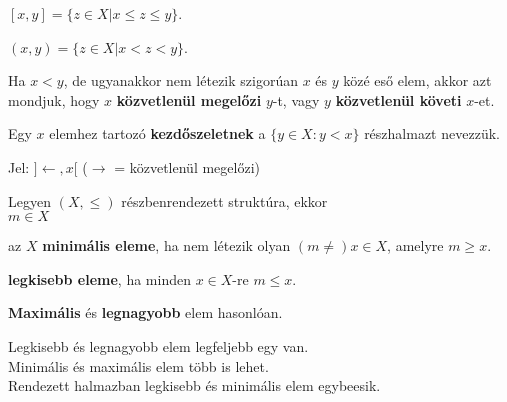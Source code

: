 \begin{frame}
\begin{tcolorbox}[title={Def.: Zárt Intervallum}]
$[x, y] = \{ z \in X | x \leq z \leq y \}$.
\end{tcolorbox}

\begin{tcolorbox}[title={Def.: Nyílt Intervallum}]
$(x, y) = \{ z \in X | x < z < y \}$.
\end{tcolorbox}

\begin{tcolorbox}[title={Def.: Közvetlenü megelőzi, Közvetlenül követi}]
Ha $x < y$, de ugyanakkor nem létezik szigorúan $x$ és $y$ közé eső elem, akkor azt mondjuk, hogy $x$ \textbf{közvetlenül megelőzi} $y$-t, vagy $y$ \textbf{közvetlenül követi} $x$-et.\\
\mmedskip

Egy $x$ elemhez tartozó \textbf{kezdőszeletnek} a $\{ y \in X : y < x \}$ részhalmazt nevezzük.\\
\mmedskip

Jel: $] {\leftarrow}, x [$ ($\rightarrow$ = közvetlenül megelőzi)
\end{tcolorbox}

\begin{tcolorbox}[title={Def.: Minimális, Maximális, Legkisebb, Legnagyobb elem}]
Legyen $(X, {\leq})$ részbenrendezett struktúra, ekkor\\
$m \in X$\\
\msmallskip

az $X$ \textbf{minimális eleme}, ha nem létezik olyan $(m {\neq}) x \in X$, amelyre $m \geq x$.\\
\mmedskip

\textbf{legkisebb eleme}, ha minden $x \in X$-re $m \leq x$.\\
\mmedskip

\textbf{Maximális} és \textbf{legnagyobb} elem hasonlóan.
\end{tcolorbox}

\begin{tcolorbox}[title={Ész}]
Legkisebb és legnagyobb elem legfeljebb egy van.\\
Minimális és maximális elem több is lehet.\\
Rendezett halmazban legkisebb és minimális elem egybeesik.
\end{tcolorbox}
\end{frame}

